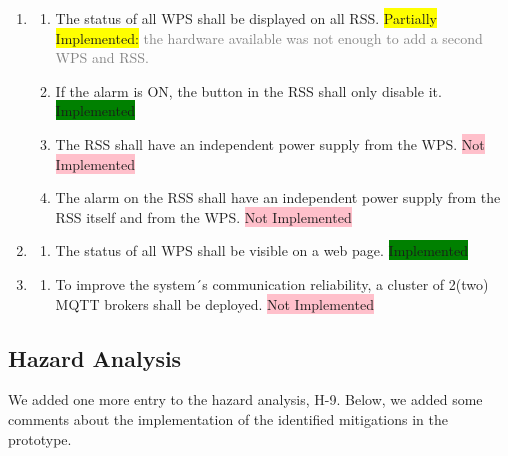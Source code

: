 \documentclass[11pt]{article}
\begin{document}
\begin{enumerate}[leftmargin=4em, font=\small, label=\textbf{SR-\arabic*}]
	\item
		\begin{enumerate}[leftmargin=1.5em, font=\small, label=\textbf{.\arabic*:}]
		\setlength\itemsep{0em}
		\item The status of all WPS shall be displayed on all RSS. \colorbox{yellow}{Partially Implemented:} \textcolor{gray}{the hardware available was not enough to add a second WPS and RSS.}
		\item If the alarm is ON, the button in the RSS shall only disable it. \colorbox{green}{Implemented}
		\item The RSS shall have an independent power supply from the WPS. \colorbox{pink}{Not Implemented}
		\item The alarm on the RSS shall have an independent power supply from the RSS itself and from the WPS. \colorbox{pink}{Not Implemented}
		\end{enumerate}
	
	\item	
		\begin{enumerate}[leftmargin=1.5em, font=\small, label=\textbf{.\arabic*:}]
		\setlength\itemsep{0em}
		\item The status of all WPS shall be visible on a web page. \colorbox{green}{Implemented}
		\end{enumerate}

	\item
		\begin{enumerate}[leftmargin=1.5em, font=\small, label=\textbf{.\arabic*:}]
		\setlength\itemsep{0em}
		\item To improve the system´s communication reliability, a cluster of 2(two) MQTT brokers shall be deployed. \colorbox{pink}{Not Implemented} 
		\end{enumerate}

\end{enumerate}

\subsection{Hazard Analysis}

We added one more entry to the hazard analysis, H-9. Below, we added some comments about the implementation of the identified mitigations in the prototype.
\end{document}
